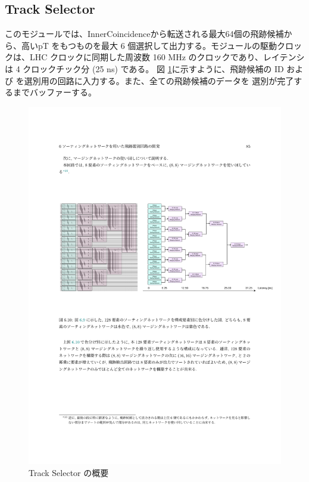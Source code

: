 \subsection*{Track Selector}
このモジュールでは、InnerCoincidenceから転送される最大64個の飛跡候補から、高いpT をもつものを最大 6 個選択して出力する。モジュールの駆動クロックは、LHC クロックに同期した周波数 160 MHz のクロックであり、レイテンシは 4 クロックチック分 (25 ns) である。
図 \ref{TrackSelector_overview}に示すように、飛跡候補の ID および \pt を選別用の回路に入力する。また、全ての飛跡候補のデータを 選別が完了するまでバッファーする。

\begin{figure} 
    \centering
    \includegraphics[width=16cm]{fig/SL/TrackSelector_overview.pdf}
    \caption[Track Selector の概要]{Track Selector の概要}
    \label{TrackSelector_overview}
    \end{figure}
    


